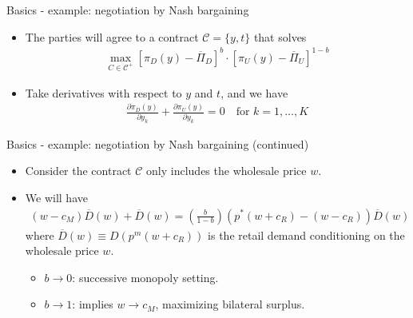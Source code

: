 \documentclass[aspectratio=169]{beamer}  %
\begin{document}
\begin{frame}{Basics - example: negotiation by Nash bargaining}
    \begin{itemize}
        \item The parties will agree to a contract $\mathcal{C} = \{y, t\}$ that solves 
        \begin{align}
            \max_{C \in \mathcal{C}^+} \left[ \pi_D(y) - \overline{\Pi}_D \right]^b \cdot \left[ \pi_U(y) - \overline{\Pi}_U \right]^{1-b}
        \end{align}
        \item Take derivatives with respect to $y$ and $t$, and we have
        \begin{align}
            \frac{\partial \pi_D(y)}{\partial y_k} + \frac{\partial \pi_U(y)}{\partial y_k} = 0 \quad \text{for } k = 1, \ldots, K
        \end{align}
            
    \end{itemize}
\end{frame}



\begin{frame}{Basics - example: negotiation by Nash bargaining (continued)}
    \begin{itemize}
        \item Consider the contract $\mathcal{C}$ only includes the wholesale price $w$. \vspace{.2cm}
        \item We will have
        \begin{align}
            (w - c_M) \overline{D}(w) + \overline{D}(w) = \left( \frac{b}{1 - b} \right) \left( p^* \left( w + c_R \right) - (w - c_R) \right) \overline{D}(w)
        \end{align}
        where $\overline{D}(w) \equiv D(p^m(w+c_R))$ is the retail demand conditioning on the wholesale price $w$. \vspace{.2cm}
        \begin{itemize}
            \item $b\rightarrow0$: successive monopoly setting. \vspace{.2cm}
            \item $b\rightarrow1$: implies $w\rightarrow c_M$, maximizing bilateral surplus. \vspace{.2cm}
        \end{itemize}
    \end{itemize}

\end{frame}
\end{document}
